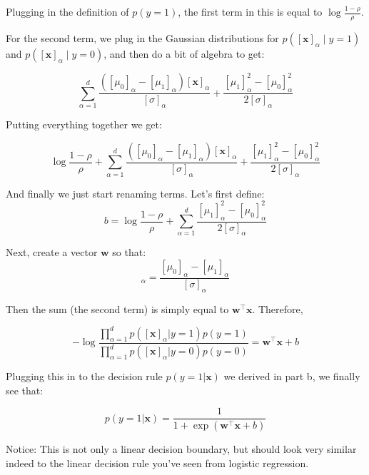 \documentclass[11pt]{article}
\begin{document}
Plugging in the definition of $p(y=1)$, the first term in this is equal to $\log \frac{1-\rho}{\rho}$. 

For the second term, we plug in the Gaussian distributions for $p([\mathbf{x}]_{\alpha} \mid y=1)$ and $p([\mathbf{x}]_{\alpha} \mid y=0)$, and then do a bit of algebra to get:

\begin{equation*}
\sum_{\alpha=1}^{d} \frac{([\mu_{0}]_{\alpha}-[\mu_{1}]_{\alpha})[\mathbf{x}]_{\alpha}}{[\sigma]_{\alpha}} + \frac{[\mu_{1}]^{2}_{\alpha}-[\mu_{0}]^{2}_{\alpha}}{2[\sigma]_{\alpha}}
\end{equation*}

Putting everything together we get:

\begin{equation*}
\log \frac{1-\rho}{\rho} + \sum_{\alpha=1}^{d} \frac{([\mu_{0}]_{\alpha}-[\mu_{1}]_{\alpha})[\mathbf{x}]_{\alpha}}{[\sigma]_{\alpha}} + \frac{[\mu_{1}]^{2}_{\alpha}-[\mu_{0}]^{2}_{\alpha}}{2[\sigma]_{\alpha}}
\end{equation*}

And finally we just start renaming terms. Let's first define:
\begin{equation*}
b = \log \frac{1-\rho}{\rho} + \sum_{\alpha=1}^{d} \frac{[\mu_{1}]^{2}_{\alpha}-[\mu_{0}]^{2}_{\alpha}}{2[\sigma]_{\alpha}}
\end{equation*}

Next, create a vector $\mathbf{w}$ so that:
\begin{equation*}
[\mathbf{w}]_{\alpha} = \frac{[\mu_{0}]_{\alpha}-[\mu_{1}]_{\alpha}}{[\sigma]_{\alpha}}
\end{equation*}

Then the sum (the second term) is simply equal to $\mathbf{w}^{\top}\mathbf{x}$. Therefore,

\begin{equation*}
-\log\frac{\prod_{\alpha=1}^{d} p([\mathbf{x}]_{\alpha}|y=1)p(y=1)}{\prod_{\alpha=1}^{d} p([\mathbf{x}]_{\alpha}|y=0)p(y=0)} = \mathbf{w}^{\top}\mathbf{x}+b
\end{equation*}

Plugging this in to the decision rule $p(y=1|\mathbf{x})$ we derived in part b, we finally see that:

\begin{equation*}
	p(y=1|\mathbf{x}) = \frac{1}{1+\exp\left(\mathbf{w}^{\top}\mathbf{x}+b\right)}
\end{equation*}

Notice: This is not only a linear decision boundary, but should look very similar indeed to the linear decision rule you've seen from logistic regression.
\end{document}
